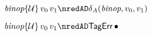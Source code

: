 {\begin{lamportproof*}
    \begin{pfproof}
        \begin{pfproof}
          \qedstep
            \begin{pfproof}
              $\ebinopt{\tdyn}{\svalue_0}{\svalue_1} \nredAD \sdeltaA(\sbinop, \svalue_0, \svalue_1)$
            \end{pfproof}
        \end{pfproof}
        \begin{pfproof}
          \qedstep
            \begin{pfproof}
              $\ebinopt{\tdyn}{\svalue_0}{\svalue_1} \nredAD \tagerrorD$
            \end{pfproof}
        \end{pfproof}
    \end{pfproof}

\end{lamportproof*}}

